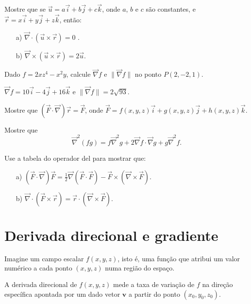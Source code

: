 \begin{exer}
Mostre que se $\vec{u}=a\vec{i}+b\vec{j}+c\vec{k}$, onde $a$, $b$ e $c$ são constantes, e $\vec{r}=x\vec{i}+y\vec{j}+z\vec{k}$, então:
\begin{itemize}
 \item[a)] $\vec{\nabla}\cdot (\vec{u}\times \vec{r})=0$ .
 \item[b)] $\vec{\nabla}\times (\vec{u}\times \vec{r})=2\vec{u}$.
\end{itemize}
\end{exer}
\begin{exer} Dado $f=2xz^4-x^2y$, calcule $\vec{\nabla}f$ e $\|\vec{\nabla}f\|$ no ponto $P(2,-2,1)$.
\end{exer}
\begin{resp}
 $\vec{\nabla}f=10\vec{i}-4\vec{j}+16\vec{k}$ e $\|\vec{\nabla}f\|=2\sqrt{93}$.
\end{resp}
\begin{exer}
Mostre que $(\vec{F}\cdot\vec{\nabla})\vec{r}=\vec{F}$, onde $\vec{F}=f(x,y,z)\vec{i}+g(x,y,z)\vec{j}+h(x,y,z)\vec{k}$.
\end{exer}

\begin{exer}
 Mostre que
 $$
 \vec{\nabla}^2(fg)=f\vec{\nabla}^2g+2\vec{\nabla}f\cdot \vec{\nabla}g+g\vec{\nabla}^2f.
 $$
\end{exer}
\begin{exer}
 Use a  tabela do operador del para mostrar que:
 \begin{itemize}
  \item[a)] $(\vec{F}\cdot\vec{\nabla})\vec{F}=\frac{1}{2}\vec{\nabla}(\vec{F}\cdot\vec{F})-\vec{F}\times (\vec{\nabla}\times\vec{F})$.
  \item[b)] $\vec{\nabla}\cdot(\vec{F}\times\vec{r})=\vec{r}\cdot(\vec{\nabla}\times\vec{F})$.
 \end{itemize}
\end{exer}


\section{Derivada direcional e gradiente}


Imagine um campo escalar $f(x, y, z)$, isto é, uma função que atribui um valor numérico a cada ponto $ (x, y, z) $ numa região do espaço. 

A derivada direcional de $f(x, y, z)$ mede a taxa de variação  de $f$ na direção específica apontada por um dado vetor \( \mathbf{v} \) a partir do ponto \( (x_0, y_0, z_0) \).

